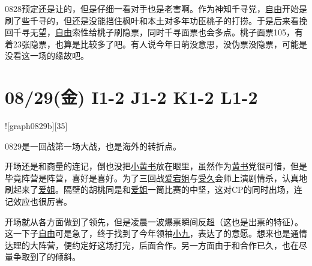 0828预定还是让的，但是仔细一看对手也是老害啊。作为神知千寻党，\uline{自由}开始是刷了些千寻的，但还是没能挡住枫叶和本土对多年功臣桃子的打捞。于是后来看挽回千寻无望，\uline{自由}索性给桃子刷隐票，同时千寻面票也会多点。桃子面票105，有着23张隐票，也算是比较多了吧。有人说今年日萌没意思，没伪票没隐票，可能是没看这一场的缘故吧。

\section{08/29(金) I1-2 J1-2 K1-2 L1-2}


![graph0829b][35]

0829是一回战第一场大战，也是海外的转折点。

开场还是和商量的连记，倒也没把\uline{小黄书}放在眼里，虽然作为\uline{黄书}党很可惜，但是毕竟阵营是阵营，喜好是喜好。为了三回战\uline{爱宕姐}与\uline{受久}会师上演剧情杀，认真地刷起来了\uline{爱姐}。隔壁的胡桃同是和\uline{爱姐}一筒比赛的中坚，这对CP的同时出场，连记效应也很厉害。

开场就从各方面做到了领先，但是凌晨一波爆票瞬间反超（这也是出票的特征）。这一下子\uline{自由}可是急了，终于找到了今年领袖\uline{小九}，表达了的意愿。想来也是通情达理的大阵营，便约定好这场打完，后面合作。另一方面由于和合作已久，也在尽量争取到了的倾斜。

